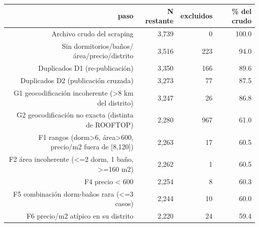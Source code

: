 \begin{tabular}{rrrr}
\toprule
paso & N restante & excluidos & \% del crudo \\
\midrule
Archivo crudo del scraping & 3,739 & 0 & 100.0 \\
Sin dormitorios/baños/área/precio/distrito & 3,516 & 223 & 94.0 \\
Duplicados D1 (re-publicación) & 3,350 & 166 & 89.6 \\
Duplicados D2 (publicación cruzada) & 3,273 & 77 & 87.5 \\
G1 geocodificación incoherente (>8 km del distrito) & 3,247 & 26 & 86.8 \\
G2 geocodificación no exacta (distinta de ROOFTOP) & 2,280 & 967 & 61.0 \\
F1 rangos (dorm>6, área>600, precio/m2 fuera de [8,120]) & 2,263 & 17 & 60.5 \\
F2 área incoherente (<=2 dorm, 1 baño, >=160 m2) & 2,262 & 1 & 60.5 \\
F4 precio < 600 & 2,254 & 8 & 60.3 \\
F5 combinación dorm-baños rara (<=3 casos) & 2,244 & 10 & 60.0 \\
F6 precio/m2 atípico en su distrito & 2,220 & 24 & 59.4 \\
\bottomrule
\end{tabular}